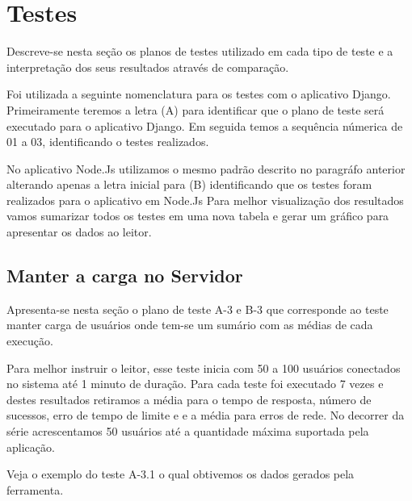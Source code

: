 \section{Testes}

  Descreve-se nesta seção os planos de testes utilizado em cada tipo de teste e a interpretação dos seus resultados
  através de comparação.
  
  Foi utilizada a seguinte nomenclatura para os testes com o aplicativo Django. Primeiramente teremos a letra (A) para identificar
  que o plano de teste será executado para o aplicativo Django. Em seguida temos a sequência númerica de 01 a 03, 
  identificando o testes realizados. 
  
  No aplicativo Node.Js utilizamos o mesmo padrão descrito no paragráfo anterior alterando apenas a letra inicial para (B) identificando
  que os testes foram realizados para o aplicativo em Node.Js
  Para melhor visualização dos resultados vamos sumarizar todos os testes em uma nova tabela e gerar um gráfico para apresentar
  os dados ao leitor.
    
\subsection{Manter a carga no Servidor}  

    
  Apresenta-se nesta seção o plano de teste A-3 e B-3 que corresponde ao teste manter carga de usuários onde tem-se um sumário
  com as médias de cada execução.
  
  Para melhor instruir o leitor, esse teste inicia com 50 a 100 usuários conectados no sistema até 1 minuto de duração. Para cada teste
  foi executado 7 vezes e destes resultados retiramos a média para o tempo de resposta, número de sucessos, erro de tempo de limite e
  e a média para erros de rede. No decorrer da série acrescentamos 50 usuários até a quantidade máxima suportada pela aplicação.
  
  Veja o exemplo do teste A-3.1 o qual obtivemos os dados gerados pela ferramenta.
  
